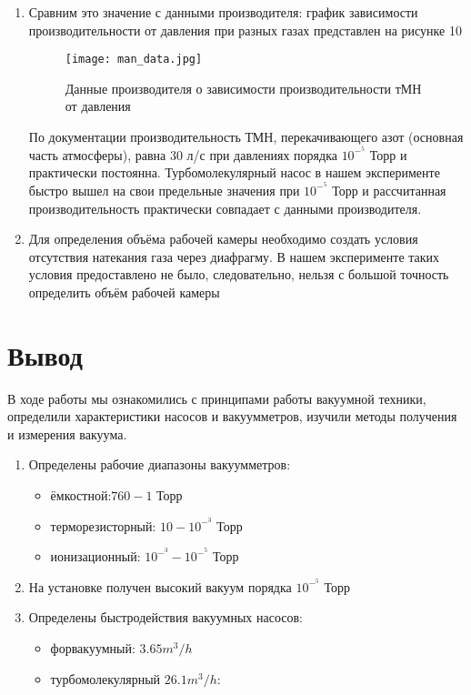 \documentclass{article}
\begin{document}
\begin{enumerate}
\item Сравним это значение с данными производителя: график зависимости производительности от давления при разных газах представлен на рисунке 10
  \begin{figure}[h]
    \centering
    \texttt{[image: man\_data.jpg]}
    \caption{Данные производителя о зависимости производительности тМН от давления}
    \label{fig:vac}
\end{figure}

По документации производительность ТМН, перекачивающего азот (основная часть атмосферы), равна 30 л/с при давлениях порядка $10^-^5$ Торр и практически постоянна. Турбомолекулярный насос в нашем эксперименте быстро вышел на свои предельные значения при $10^-^5$ Торр и рассчитанная производительность практически совпадает с данными производителя.

\item Для определения объёма рабочей камеры необходимо создать условия отсутствия натекания газа через диафрагму. В нашем эксперименте таких условия предоставлено не было, следовательно, нельзя с большой точность определить объём рабочей камеры
\end{enumerate}

\section {Вывод}
В ходе работы мы ознакомились с принципами работы вакуумной техники, определили характеристики насосов и вакуумметров, изучили методы получения и измерения вакуума. 
\begin{enumerate}
\item Определены рабочие диапазоны вакуумметров:
\begin{itemize}
  \item ёмкостной:$760 - 1$ Торр
  \item терморезисторный: $10 - 10^-^3 $ Торр
  \item ионизационный: $10^-^3 - 10^-^5$ Торр
\end{itemize}
\item На установке получен высокий вакуум порядка $10^-^5$ Торр
\item Определены быстродействия вакуумных насосов:
\begin{itemize}
  \item форвакуумный: $3.65 m^3/h$
  \item турбомолекулярный $26.1 m^3/h$: 
\end{itemize}
\end{enumerate}
\end{document}
